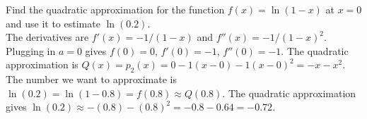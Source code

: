 \documentclass{exam}
\begin{document}
\begin{questions}
\question Find the quadratic approximation for the function $f(x) = \ln(1-x)$ at $x=0$ and use it to estimate $\ln(0.2)$.  
 \\ {\color{red}  The derivatives are $f'(x) = -1/(1-x)$ and $f''(x) = -1/(1-x)^2$.  Plugging in $a=0$ gives $f(0)=0$, $f'(0) = -1$, $f''(0) = -1$.  The quadratic approximation is $Q(x) = p_2(x) = 0 -1(x-0)-1(x-0)^2 = -x-x^2$.  The number we want to approximate is $\ln(0.2)=\ln(1-0.8)=f(0.8) \approx Q(0.8)$.  The quadratic approximation gives $\ln(0.2) \approx -(0.8)-(0.8)^2 = -0.8-0.64 = -0.72 $.}
\thispagestyle{empty}








\end{questions}
\end{document}
